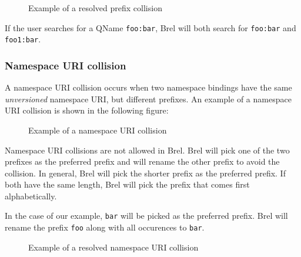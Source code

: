 \begin{figure}[H]
    \caption{Example of a resolved prefix collision}
    \label{fig:prefix_collision_example_renamed}
\end{figure}

If the user searches for a QName \texttt{foo:bar}, Brel will both search for \texttt{foo:bar} and \texttt{foo1:bar}.

\subsubsection{Namespace URI collision}

A namespace URI collision occurs when two namespace bindings have the same \textit{unversioned} namespace URI, 
but different prefixes.
An example of a namespace URI collision is shown in the following figure:

\begin{figure}[H]
    \caption{Example of a namespace URI collision}
    \label{fig:namespace_uri_collision_example}
\end{figure}

Namespace URI collisions are not allowed in Brel. Brel will pick one of the two prefixes as the preferred prefix and will rename the other prefix to avoid the collision.
In general, Brel will pick the shorter prefix as the preferred prefix. If both have the same length, Brel will pick the prefix that comes first alphabetically.

In the case of our example, \texttt{bar} will be picked as the preferred prefix. 
Brel will rename the prefix \texttt{foo} along with all occurences to \texttt{bar}.

\begin{figure}[H]
    \caption{Example of a resolved namespace URI collision}
    \label{fig:namespace_uri_collision_example_renamed}
\end{figure}

